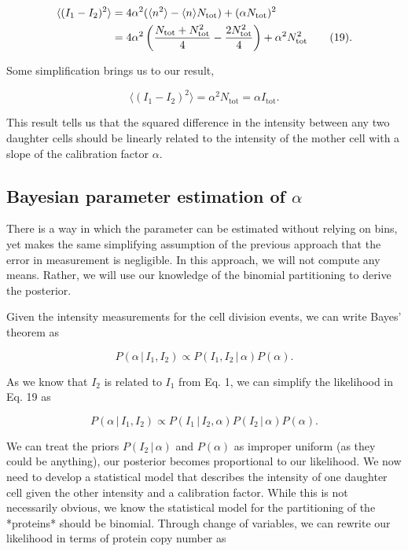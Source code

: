 \begin{align}
\langle (I_1 - I_2)^2 \rangle &= 4\alpha^2(\langle n^2 \rangle - \langle n \rangle N_\text{tot}) + (\alpha N_\text{tot})^2\\
& = 4\alpha^2\left({N_\text{tot} + N_\text{tot}^2 \over 4} - {2N_\text{tot}^2 \over 4}\right) + \alpha^2N_\text{tot}^2 \tag{19}.
\end{align}


Some simplification brings us to our result,

\begin{equation}
\langle (I_1 - I_2)^2 \rangle = \alpha^2 N_\text{tot} = \alpha I_\text{tot}. \tag{20}
\end{equation}

This result tells us that the squared difference in the intensity between any two daughter cells should be linearly related to the intensity of the mother cell with a slope of the calibration factor $\alpha$.


\subsection*{Bayesian parameter estimation of $\alpha$}

There is a way in which the parameter can be estimated without relying on bins, yet makes the same simplifying assumption of the previous approach that the error in measurement is negligible. In this approach, we will not compute any means. Rather, we will use our knowledge of the binomial partitioning to derive the posterior.

Given the intensity measurements for the cell division events, we can write Bayes' theorem as

\begin{equation}
P(\alpha\, \vert \, I_1, I_2) \propto P(I_1, I_2 \,\vert\, \alpha) P(\alpha).
\tag{19}
\end{equation}

As we know that $I_2$ is related to $I_1$ from Eq. 1, we can simplify the likelihood in Eq. 19 as

\begin{equation}
P(\alpha \, \vert \, I_1, I_2) \propto P(I_1\, \vert\, I_2, \alpha) P(I_2 \, \vert\, \alpha) P(\alpha).
\tag{20}
\end{equation}

We can treat the priors $P(I_2 \,\vert\, \alpha)$ and $P(\alpha)$ as improper uniform (as they could be anything), our posterior becomes proportional to our likelihood. We now need to develop a statistical model that describes the intensity of one daughter cell given the other intensity and a calibration factor. While this is not necessarily obvious, we know the statistical model for the partitioning of the *proteins* should be binomial. Through change of variables, we can rewrite our likelihood in terms of protein copy number as

